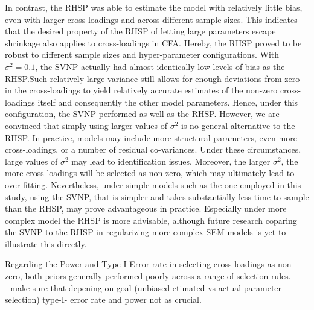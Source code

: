 \documentclass[
  english,
  man, donotrepeattitle,floatsintext]{apa6}
\begin{document}
In contrast, the RHSP was able to estimate the model with relatively little bias, even with larger cross-loadings and across different sample sizes. This indicates that the desired property of the RHSP of letting large parameters escape shrinkage also applies to cross-loadings in CFA. Hereby, the RHSP proved to be robust to different sample sizes and hyper-parameter configurations. With \(\sigma^2 = 0.1\), the SVNP actually had almost identically low levels of bias as the RHSP.Such relatively large variance still allows for enough deviations from zero in the cross-loadings to yield relatively accurate estimates of the non-zero cross-loadings itself and consequently the other model parameters. Hence, under this configuration, the SVNP performed as well as the RHSP. However, we are convinced that simply using larger values of \(\sigma^2\) is no general alternative to the RHSP. In practice, models may include more structural parameters, even more cross-loadings, or a number of residual co-variances. Under these circumstances, large values of \(\sigma^2\) may lead to identification issues. Moreover, the larger \(\sigma^2\), the more cross-loadings will be selected as non-zero, which may ultimately lead to over-fitting. Nevertheless, under simple models such as the one employed in this study, using the SVNP, that is simpler and takes substantially less time to sample than the RHSP, may prove advantageous in practice. Especially under more complex model the RHSP is more advisable, although future research coparing the SVNP to the RHSP in regularizing more complex SEM models is yet to illustrate this directly.

Regarding the Power and Type-I-Error rate in selecting cross-loadings as non-zero, both priors generally performed poorly across a range of selection rules.\\
- make sure that depening on goal (unbiased etimated vs actual parameter selection) type-I- error rate and power not as crucial.
\end{document}
